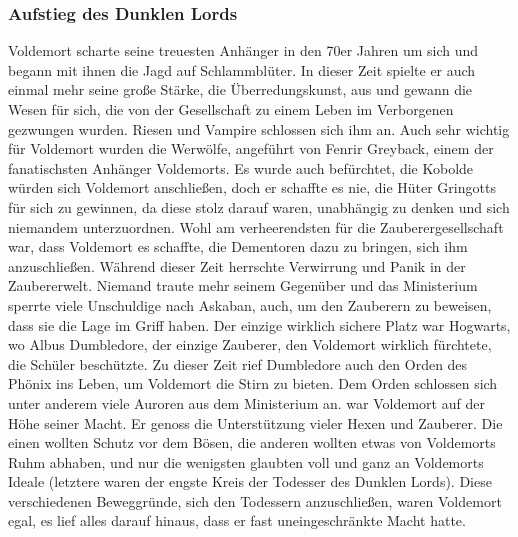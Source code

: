 \documentclass[a4paper, 10pt]{article}
\begin{document}
\subsubsection*{\large Aufstieg des Dunklen Lords}
Voldemort scharte seine treuesten Anhänger in den 70er Jahren um sich und begann mit ihnen die Jagd auf Schlammblüter.
\vspace{10pt}
\newline
In dieser Zeit spielte er auch einmal mehr seine große Stärke, die Überredungskunst, aus und gewann die Wesen für sich, die von der Gesellschaft zu einem Leben im Verborgenen gezwungen wurden. Riesen und Vampire schlossen sich ihm an. Auch sehr wichtig für Voldemort wurden die Werwölfe, angeführt von Fenrir Greyback, einem der fanatischsten Anhänger Voldemorts. Es wurde auch befürchtet, die Kobolde würden sich Voldemort anschließen, doch er schaffte es nie, die Hüter Gringotts für sich zu gewinnen, da diese stolz darauf waren, unabhängig zu denken und sich niemandem unterzuordnen. Wohl am verheerendsten für die Zauberergesellschaft war, dass Voldemort es schaffte, die Dementoren dazu zu bringen, sich ihm anzuschließen.
\vspace{10pt}
\newline
Während dieser Zeit herrschte Verwirrung und Panik in der Zaubererwelt. Niemand traute mehr seinem Gegenüber und das Ministerium sperrte viele Unschuldige nach Askaban, auch, um den Zauberern zu beweisen, dass sie die Lage im Griff haben.
\vspace{10pt}
\newline
Der einzige wirklich sichere Platz war Hogwarts, wo Albus Dumbledore, der einzige Zauberer, den Voldemort wirklich fürchtete, die Schüler beschützte. Zu dieser Zeit rief Dumbledore auch den Orden des Phönix ins Leben, um Voldemort die Stirn zu bieten. Dem Orden schlossen sich unter anderem viele Auroren aus dem Ministerium an.
\vspace{10pt}
 war Voldemort auf der Höhe seiner Macht. Er genoss die Unterstützung vieler Hexen und Zauberer. Die einen wollten Schutz vor dem Bösen, die anderen wollten etwas von Voldemorts Ruhm abhaben, und nur die wenigsten glaubten voll und ganz an Voldemorts Ideale (letztere waren der engste Kreis der Todesser des Dunklen Lords). Diese verschiedenen Beweggründe, sich den Todessern anzuschließen, waren Voldemort egal, es lief alles darauf hinaus, dass er fast uneingeschränkte Macht hatte.
\end{document}
